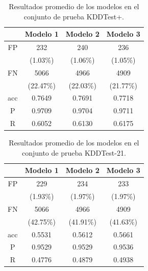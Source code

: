 \begin{table}[h!b]
    \begin{center}
        \caption{Resultados promedio de los modelos en el conjunto de prueba KDDTest+.}

        \label{tab:kddtest+_results}
        \begin{tabular}{c|c|c|c} %
        \textbf{} & \textbf{Modelo 1} & \textbf{Modelo 2} & \textbf{Modelo 3}\\
        \hline
        FP & 232 & 240 & 236\\
        &(1.03\%)&(1.06\%)&(1.05\%)\\
        FN & 5066 & 4966 & 4909\\
        &(22.47\%)&(22.03\%)&(21.77\%)\\
        acc & 0.7649 & 0.7691 & 0.7718\\
        P & 0.9709 & 0.9704 & 0.9711\\
        R & 0.6052 & 0.6130 & 0.6175\\
        \end{tabular}
    \end{center}
\end{table}

\begin{table}[t]
    \begin{center}
        \caption{Resultados promedio de los modelos en el conjunto de prueba KDDTest-21.}

        \label{tab:kddtest21_results}
        \begin{tabular}{c|c|c|c} %
        \textbf{} & \textbf{Modelo 1} & \textbf{Modelo 2} & \textbf{Modelo 3}\\
        \hline
        FP & 229 & 234 & 233\\
        &(1.93\%)&(1.97\%)&(1.97\%)\\
        FN & 5066 & 4966 & 4909\\
        &(42.75\%)&(41.91\%)&(41.63\%)\\
        acc & 0.5531 & 0.5612 & 0.5661\\
        P & 0.9529 & 0.9529 & 0.9536\\
        R & 0.4776 & 0.4879 & 0.4938\\
        \end{tabular}
    \end{center}
\end{table}

